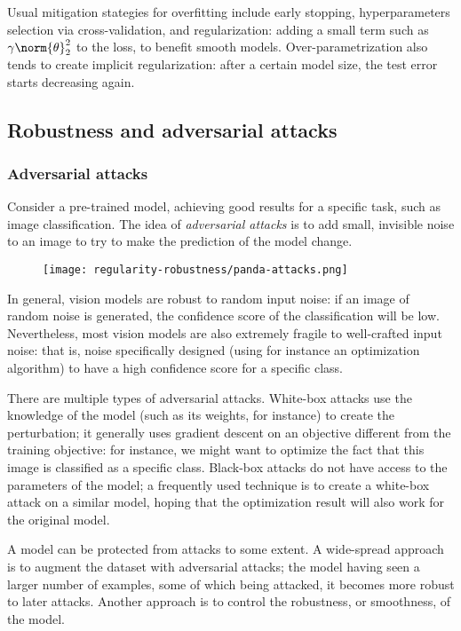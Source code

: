 Usual mitigation stategies for overfitting include early stopping, hyperparameters selection via cross-validation, and regularization: adding a small term such as $\gamma\norm{\theta}_2^2$ to the loss, to benefit smooth models. Over-parametrization also tends to create implicit regularization: after a certain model size, the test error starts decreasing again.

\subsection{Robustness and adversarial attacks}
\subsubsection{Adversarial attacks}
Consider a pre-trained model, achieving good results for a specific task, such as image classification. The idea of \emph{adversarial attacks} is to add small, invisible noise to an image to try to make the prediction of the model change.
\begin{figure}[H]
    \centering
    \texttt{[image: regularity-robustness/panda-attacks.png]}
\end{figure}
In general, vision models are robust to random input noise: if an image of random noise is generated, the confidence score of the classification will be low. Nevertheless, most vision models are also extremely fragile to well-crafted input noise: that is, noise specifically designed (using for instance an optimization algorithm) to have a high confidence score for a specific class.

There are multiple types of adversarial attacks. White-box attacks use the knowledge of the model (such as its weights, for instance) to create the perturbation; it generally uses gradient descent on an objective different from the training objective: for instance, we might want to optimize the fact that this image is classified as a specific class. Black-box attacks do not have access to the parameters of the model; a frequently used technique is to create a white-box attack on a similar model, hoping that the optimization result will also work for the original model.

A model can be protected from attacks to some extent. A wide-spread approach is to augment the dataset with adversarial attacks; the model having seen a larger number of examples, some of which being attacked, it becomes more robust to later attacks. Another approach is to control the robustness, or smoothness, of the model. 

